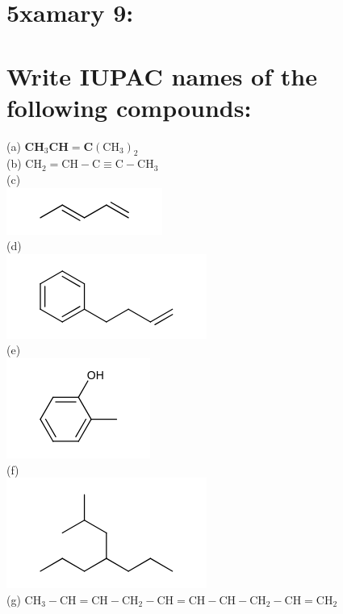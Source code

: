 \documentclass[10pt]{article}
\begin{document}
\section*{5xamary 9:}
\section*{Write IUPAC names of the following compounds:}
(a) $\mathbf{C H}_{3} \mathbf{C H}=\mathbf{C}\left(\mathrm{CH}_{3}\right)_{2}$\\
(b) $\mathrm{CH}_{2}=\mathrm{CH}-\mathrm{C} \equiv \mathrm{C}-\mathrm{CH}_{3}$\\
(c)\\
\includegraphics{smile-28043bdb021e5a846a721de99c94143b3c824c35}\\
(d)\\
\includegraphics{smile-bcd6d1a950085ce889f64a0ae964f2c7ce785247}\\
(e)\\
\includegraphics{smile-e2af22c2df89dd8dbe41efbc1226beb7723d61ff}\\
(f)\\
\includegraphics{smile-1ce7686f131f66ba950ebbfd9612af8b59539d02}\\
(g) $\mathrm{CH}_{3}-\mathrm{CH}=\mathrm{CH}-\mathrm{CH}_{2}-\mathrm{CH}=\mathrm{CH}-\mathrm{CH}-\mathrm{CH}_{2}-\mathrm{CH}=\mathrm{CH}_{2}$
\end{document}
